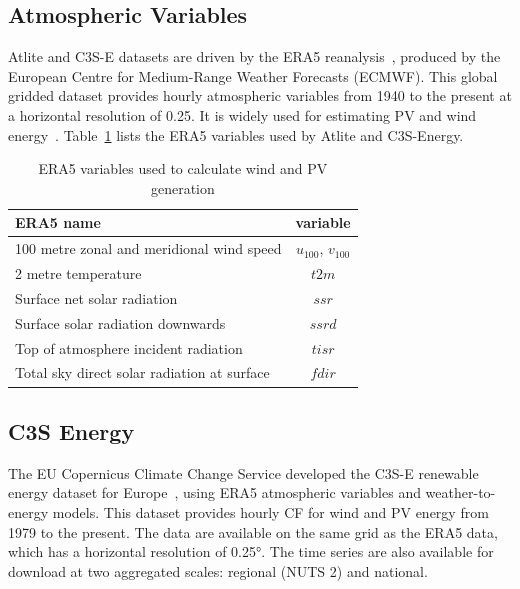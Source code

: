 \documentclass[preprint, 12pt]{elsarticle}
\begin{document}
\subsection{Atmospheric Variables}
\label{sec:era5}

Atlite and C3S-E datasets are driven by the ERA5 reanalysis~\citep{hersbach2020era5}, produced by the European Centre for Medium-Range Weather Forecasts (ECMWF). This global gridded dataset provides hourly atmospheric variables from 1940 to the present at a horizontal resolution of 0.25\textdegree. It is widely used for estimating PV and wind energy~\citep{mockert2023drought, dubus2023energy, brown2021drought, otero2022drought}. Table~\ref{tab:var_name} lists the ERA5 variables used by Atlite and C3S-Energy.

\begin{table}[h!]
	\centering
	\caption{ERA5 variables used to calculate wind and PV generation}
	\begin{tabular}{|l|c|}
		\hline
		{\textbf{ERA5 name}}      & \textbf{variable} \\ \hline
		100 metre zonal and meridional wind speed   & $u_{100}$, $v_{100}$ \\
		2 metre temperature                         & $t2m$ \\
		Surface net solar radiation                 & $ssr$ \\
		Surface solar radiation downwards           & $ssrd$  \\
		Top of atmosphere incident radiation        & $tisr$  \\
		Total sky direct solar radiation at surface & $fdir$  \\ \hline
	\end{tabular}
	\label{tab:var_name}
\end{table}

\subsection{C3S Energy}
\label{sec:c3se}

The EU Copernicus Climate Change Service developed the C3S-E renewable energy dataset for Europe~\citep{dubus2023energy}, using ERA5 atmospheric variables and weather-to-energy models. This dataset provides hourly CF for wind and PV energy from 1979 to the present. The data are available on the same grid as the ERA5 data, which has a horizontal resolution of 0.25°. The time series are also available for download at two aggregated scales: regional (NUTS 2) and national.
\end{document}
